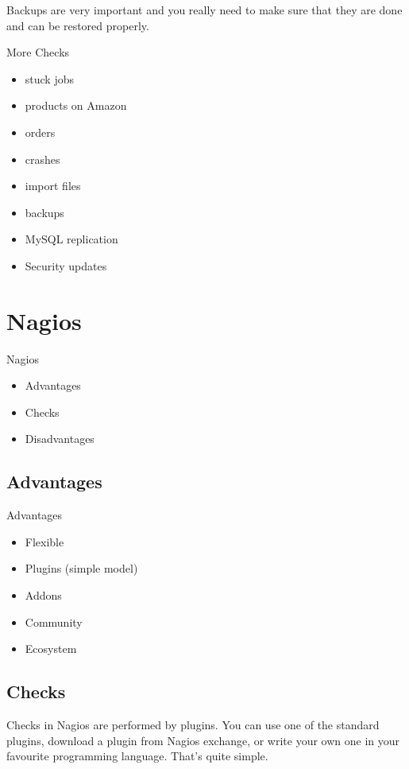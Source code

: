 Backups are very important and you really need to make sure
that they are done and can be restored properly.

\begin{frame}[fragile]{More Checks}

\begin{itemize}
\item stuck jobs
\item products on Amazon
\item orders
\item crashes
\item import files
\item backups
\item MySQL replication
\item Security updates
\end{itemize}
\end{frame}

\section{Nagios}

\begin{frame}[fragile]{Nagios}
\begin{itemize}
\item Advantages
\item Checks
\item Disadvantages
\end{itemize}
\end{frame}

\subsection{Advantages}
\begin{frame}[fragile]{Advantages}
\begin{itemize}
\item Flexible
\item Plugins (simple model)
\item Addons
\item Community
\item Ecosystem
\end{itemize}
\end{frame}

\subsection{Checks}
Checks in Nagios are performed by plugins.
You can use one of the standard plugins, download a plugin
from Nagios exchange, or write your own one in your
favourite programming language. That's quite simple.

